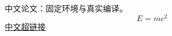 \documentclass{article}
\begin{document}
中文论文：固定环境与真实编译。
\[ E = mc^2 \]
\href{https://example.com/}{中文超链接}
\end{document}
